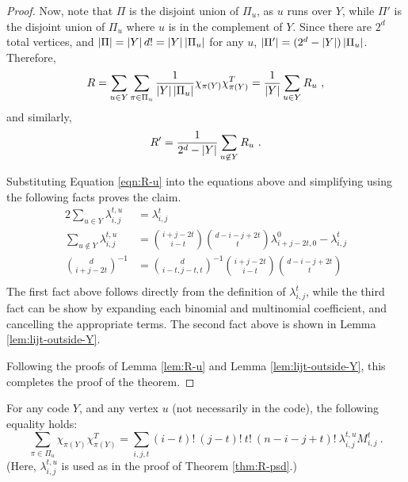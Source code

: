 \documentclass{report}
\newcommand{\lijt}{\lambda_{i, j}^t}
\newcommand{\lijtu}{\lambda_{i, j}^{t, u}}
\newcommand{\Mijt}{M_{i, j}^t}
\newcommand{\chipiY}{\chi_{\pi(Y)}}
\begin{document}
\begin{proof}
      Now, note that $\Pi$ is the disjoint union of $\Pi_u$, as $u$ runs over
      $Y$, while $\Pi'$ is the disjoint union of $\Pi_u$ where $u$ is in the
      complement of $Y$.  Since there are $2^d$ total vertices, and $\left\lvert \Pi \right\rvert =
      \left\lvert Y \right\rvert d! = \left\lvert Y \right\rvert \left\lvert \Pi_u \right\rvert$ for any $u$, $\left\lvert \Pi' \right\rvert = (2^d -
      \left\lvert Y \right\rvert) \left\lvert \Pi_u \right\rvert$.  Therefore,
      $$
        R =
          \sum_{u \in Y} \sum_{\pi \in \Pi_u} \frac{1}{\abs{Y} \abs{\Pi_u}}
          \chipiY \chipiY^T
          = \frac{1}{\abs{Y}} \sum_{u \in Y} R_u \ ,
      $$
      and similarly,
      $$
        R' = \frac{1}{2^d - \left\lvert Y \right\rvert} \sum_{u \not\in Y} R_u \ .
      $$

      Substituting Equation \ref{eqn:R-u} into the equations above and
      simplifying using the following facts proves the claim.
      \begin{alignat}{2}
        \sum_{u \in Y} \lambda_{i, j}^{t, u} &= \lijt \\
        \sum_{u \not\in Y} \lambda_{i, j}^{t, u} &=
          \binom{i + j - 2t}{i - t} \binom{d - i - j + 2t}{t} \lambda_{i + j -
          2t, 0}^0 - \lijt \\
        \binom{d}{i+j-2t}^{-1} &=
          \binom{d}{i-t, j-t, t}^{-1}\binom{i+j-2t}{i-t}\binom{d-i-j+2t}{t} \\
      \end{alignat}
      The first fact above follows directly from the definition of $\lijt$,
      while the third fact can be show by expanding each binomial and
      multinomial coefficient, and cancelling the appropriate terms.  The second
      fact above is shown in Lemma \ref{lem:lijt-outside-Y}.

      Following the proofs of Lemma \ref{lem:R-u} and Lemma
      \ref{lem:lijt-outside-Y}, this completes the proof of the theorem.

    \end{proof}

    \begin{lem}\label{lem:R-u}
      For any code $Y$, and any vertex $u$ (not necessarily in the code), the
      following equality holds:
      $$
        \sum_{\pi \in \Pi_u} \chipiY \chipiY^T =
        \sum_{i, j, t} (i-t)!\ (j-t)!\ t!\ (n-i-j+t)!\ \lijtu \Mijt \ .
      $$
      (Here, $\lambda_{i, j}^{t, u}$ is used as in the proof of Theorem
      \ref{thm:R-psd}.)
    \end{lem}
\end{document}
